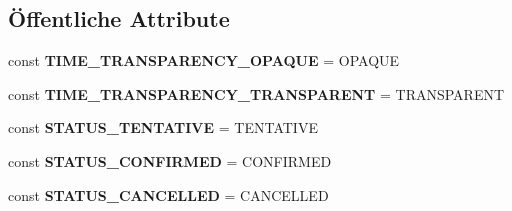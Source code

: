 \subsection*{Öffentliche Attribute}
\begin{DoxyCompactItemize}
\item 
\mbox{\label{class_eluceo_1_1i_cal_1_1_component_1_1_event_a109134e26133140ff5f1ac009e01077c}} 
const {\bfseries T\+I\+M\+E\+\_\+\+T\+R\+A\+N\+S\+P\+A\+R\+E\+N\+C\+Y\+\_\+\+O\+P\+A\+Q\+UE} = \textquotesingle{}O\+P\+A\+Q\+UE\textquotesingle{}
\item 
\mbox{\label{class_eluceo_1_1i_cal_1_1_component_1_1_event_a59dd30e76d97b0daff38a4a063cbd514}} 
const {\bfseries T\+I\+M\+E\+\_\+\+T\+R\+A\+N\+S\+P\+A\+R\+E\+N\+C\+Y\+\_\+\+T\+R\+A\+N\+S\+P\+A\+R\+E\+NT} = \textquotesingle{}T\+R\+A\+N\+S\+P\+A\+R\+E\+NT\textquotesingle{}
\item 
\mbox{\label{class_eluceo_1_1i_cal_1_1_component_1_1_event_af18efa10931a96098b19d2171b0980a8}} 
const {\bfseries S\+T\+A\+T\+U\+S\+\_\+\+T\+E\+N\+T\+A\+T\+I\+VE} = \textquotesingle{}T\+E\+N\+T\+A\+T\+I\+VE\textquotesingle{}
\item 
\mbox{\label{class_eluceo_1_1i_cal_1_1_component_1_1_event_aa1e1c71f337dabc8556fd11eb1179d49}} 
const {\bfseries S\+T\+A\+T\+U\+S\+\_\+\+C\+O\+N\+F\+I\+R\+M\+ED} = \textquotesingle{}C\+O\+N\+F\+I\+R\+M\+ED\textquotesingle{}
\item 
\mbox{\label{class_eluceo_1_1i_cal_1_1_component_1_1_event_a1ee57c2a9740ce2481746768a2b43c33}} 
const {\bfseries S\+T\+A\+T\+U\+S\+\_\+\+C\+A\+N\+C\+E\+L\+L\+ED} = \textquotesingle{}C\+A\+N\+C\+E\+L\+L\+ED\textquotesingle{}
\end{DoxyCompactItemize}
